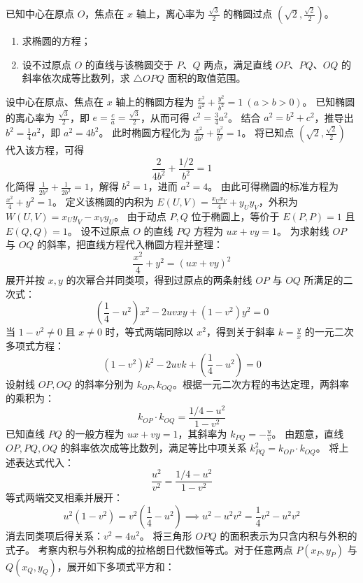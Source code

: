 \begin{example}
已知中心在原点 \(O\)，焦点在 \(x\) 轴上，离心率为 \(\frac{\sqrt{3}}{2}\) 的椭圆过点 \((\sqrt{2},\frac{\sqrt{2}}{2})\)。
\begin{enumerate}
    \item[(1)] 求椭圆的方程；
    \item[(2)] 设不过原点 \(O\) 的直线与该椭圆交于 \(P\)、\(Q\) 两点，满足直线 \(OP\)、\(PQ\)、\(OQ\) 的斜率依次成等比数列，求 \(\triangle OPQ\) 面积的取值范围。
\end{enumerate}
\end{example}
\begin{solution}
设中心在原点、焦点在 $x$ 轴上的椭圆方程为 $\frac{x^2}{a^2} + \frac{y^2}{b^2} = 1\ (a > b > 0)$。
已知椭圆的离心率为 $\frac{\sqrt{3}}{2}$，即 $e = \frac{c}{a} = \frac{\sqrt{3}}{2}$，从而可得 $c^2 = \frac{3}{4}a^2$。
结合 $a^2 = b^2 + c^2$，推导出 $b^2 = \frac{1}{4}a^2$，即 $a^2 = 4b^2$。
此时椭圆方程化为 $\frac{x^2}{4b^2} + \frac{y^2}{b^2} = 1$。
将已知点 $\left(\sqrt{2}, \frac{\sqrt{2}}{2}\right)$ 代入该方程，可得
$$ \frac{2}{4b^2} + \frac{1/2}{b^2} = 1 $$
化简得 $\frac{1}{2b^2} + \frac{1}{2b^2} = 1$，解得 $b^2 = 1$，进而 $a^2 = 4$。
由此可得椭圆的标准方程为 $\frac{x^2}{4} + y^2 = 1$。
定义该椭圆的内积为 $E(U, V) = \frac{x_U x_V}{4} + y_U y_V$，外积为 $W(U, V) = x_U y_V - x_V y_U$。
由于动点 $P, Q$ 位于椭圆上，等价于 $E(P, P) = 1$ 且 $E(Q, Q) = 1$。
设不过原点 $O$ 的直线 $PQ$ 方程为 $ux + vy = 1$。
为求射线 $OP$ 与 $OQ$ 的斜率，把直线方程代入椭圆方程并整理：
$$ \frac{x^2}{4} + y^2 = (ux + vy)^2 $$
展开并按 $x, y$ 的次幂合并同类项，得到过原点的两条射线 $OP$ 与 $OQ$ 所满足的二次式：
$$ \left(\frac{1}{4} - u^2\right)x^2 - 2uvxy + (1 - v^2)y^2 = 0 $$
当 $1 - v^2 \neq 0$ 且 $x \neq 0$ 时，等式两端同除以 $x^2$，得到关于斜率 $k = \frac{y}{x}$ 的一元二次多项式方程：
$$ (1 - v^2)k^2 - 2uvk + \left(\frac{1}{4} - u^2\right) = 0 $$
设射线 $OP, OQ$ 的斜率分别为 $k_{OP}, k_{OQ}$。根据一元二次方程的韦达定理，两斜率的乘积为：
$$ k_{OP} \cdot k_{OQ} = \frac{1/4 - u^2}{1 - v^2} $$
已知直线 $PQ$ 的一般方程为 $ux + vy = 1$，其斜率为 $k_{PQ} = -\frac{u}{v}$。
由题意，直线 $OP, PQ, OQ$ 的斜率依次成等比数列，满足等比中项关系 $k_{PQ}^2 = k_{OP} \cdot k_{OQ}$。
将上述表达式代入：
$$ \frac{u^2}{v^2} = \frac{1/4 - u^2}{1 - v^2} $$
等式两端交叉相乘并展开：
$$ u^2(1 - v^2) = v^2\left(\frac{1}{4} - u^2\right) \implies u^2 - u^2 v^2 = \frac{1}{4}v^2 - u^2 v^2 $$
消去同类项后得关系：$v^2 = 4u^2$。
将三角形 $OPQ$ 的面积表示为只含内积与外积的式子。
考察内积与外积构成的拉格朗日代数恒等式。对于任意两点 $P(x_P, y_P)$ 与 $Q(x_Q, y_Q)$，展开如下多项式平方和：

\end{solution}
